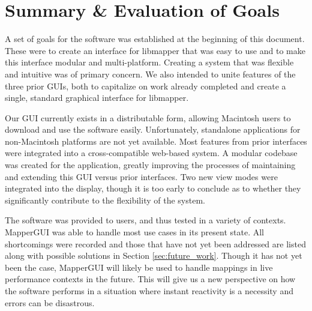 \section{Summary \& Evaluation of Goals} %
\label{sec:evaluation_of_goals}

A set of goals for the software was established at the beginning of this document. These were to create an interface for libmapper that was easy to use and to make this interface modular and multi-platform. Creating a system that was flexible and intuitive was of primary concern. We also intended to unite features of the three prior GUIs, both to capitalize on work already completed and create a single, standard graphical interface for libmapper. 

Our GUI currently exists in a distributable form, allowing Macintosh users to download and use the software easily. Unfortunately, standalone applications for non-Macintosh platforms are not yet available. Most features from prior interfaces were integrated into a cross-compatible web-based system. A modular codebase was created for the application, greatly improving the processes of maintaining and extending this GUI versus prior interfaces. Two new view modes were integrated into the display, though it is too early to conclude as to whether they significantly contribute to the flexibility of the system.

The software was provided to users, and thus tested in a variety of contexts. MapperGUI was able to handle most use cases in its present state. All shortcomings were recorded and those that have not yet been addressed are listed along with possible solutions in Section \ref{sec:future_work}. Though it has not yet been the case, MapperGUI will likely be used to handle mappings in live performance contexts in the future. This will give us a new perspective on how the software performs in a situation where instant reactivity is a necessity and errors can be disastrous. 
	




